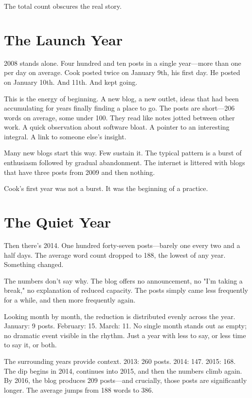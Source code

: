 The total count obscures the real story.


\bigskip

\section*{The Launch Year}

2008 stands alone. Four hundred and ten posts in a single year—more than one per day on average. Cook posted twice on January 9th, his first day. He posted on January 10th. And 11th. And kept going.

This is the energy of beginning. A new blog, a new outlet, ideas that had been accumulating for years finally finding a place to go. The posts are short—206 words on average, some under 100. They read like notes jotted between other work. A quick observation about software bloat. A pointer to an interesting integral. A link to someone else's insight.

Many new blogs start this way. Few sustain it. The typical pattern is a burst of enthusiasm followed by gradual abandonment. The internet is littered with blogs that have three posts from 2009 and then nothing.

Cook's first year was not a burst. It was the beginning of a practice.

\bigskip

\section*{The Quiet Year}

Then there's 2014. One hundred forty-seven posts—barely one every two and a half days. The average word count dropped to 188, the lowest of any year. Something changed.

The numbers don't say why. The blog offers no announcement, no "I'm taking a break," no explanation of reduced capacity. The posts simply came less frequently for a while, and then more frequently again.

Looking month by month, the reduction is distributed evenly across the year. January: 9 posts. February: 15. March: 11. No single month stands out as empty; no dramatic event visible in the rhythm. Just a year with less to say, or less time to say it, or both.

The surrounding years provide context. 2013: 260 posts. 2014: 147. 2015: 168. The dip begins in 2014, continues into 2015, and then the numbers climb again. By 2016, the blog produces 209 posts—and crucially, those posts are significantly longer. The average jumps from 188 words to 386.

